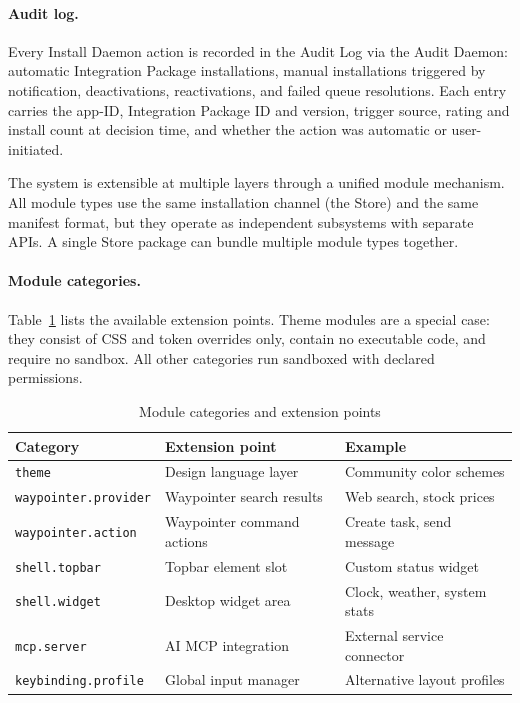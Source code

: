 \paragraph{Audit log.}
Every Install Daemon action is recorded in the Audit Log via the Audit Daemon:
automatic Integration Package installations, manual installations triggered by
notification, deactivations, reactivations, and failed queue resolutions. Each
entry carries the app-ID, Integration Package ID and version, trigger source,
rating and install count at decision time, and whether the action was automatic
or user-initiated.

The system is extensible at multiple layers through a unified module mechanism.
All module types use the same installation channel (the Store) and the same
manifest format, but they operate as independent subsystems with separate APIs.
A single Store package can bundle multiple module types together.

\paragraph{Module categories.}
Table~\ref{tab:modules} lists the available extension points. Theme modules
are a special case: they consist of CSS and token overrides only, contain no
executable code, and require no sandbox. All other categories run sandboxed
with declared permissions.

\begin{table}[htbp]
\caption{Module categories and extension points}
\label{tab:modules}
\begin{tabularx}{\linewidth}{llX}
\toprule
\textbf{Category} & \textbf{Extension point} & \textbf{Example} \\
\midrule
\texttt{theme}               & Design language layer     & Community color schemes \\
\texttt{waypointer.provider} & Waypointer search results & Web search, stock prices \\
\texttt{waypointer.action}   & Waypointer command actions & Create task, send message \\
\texttt{shell.topbar}        & Topbar element slot       & Custom status widget \\
\texttt{shell.widget}        & Desktop widget area       & Clock, weather, system stats \\
\texttt{mcp.server}          & AI MCP integration        & External service connector \\
\texttt{keybinding.profile}  & Global input manager      & Alternative layout profiles \\
\bottomrule
\end{tabularx}
\end{table}

